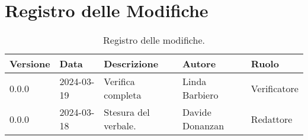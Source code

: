 \section*{Registro delle Modifiche}
\begin{table}[ht!]	
		\centering
		\begin{tabular}{p{1.2cm} p{2cm} p{6cm} p{3cm} p{2cm}}
			\toprule
			\textbf{Versione}& \textbf{Data} & \textbf{Descrizione} & \textbf{Autore} & \textbf{Ruolo} \\
			\midrule
			0.0.0 & 2024-03-19 & Verifica completa  & Linda Barbiero &
			Verificatore \\ %
			0.0.0 & 2024-03-18 & Stesura del verbale.  & Davide Donanzan &
			Redattore \\ %
			\bottomrule
		\end{tabular}
		\caption{Registro delle modifiche.}
		\label{table:Registro delle modifiche.}
\end{table}